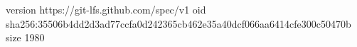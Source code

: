 version https://git-lfs.github.com/spec/v1
oid sha256:35506b4dd2d3ad77ccfa0d242365cb462e35a40dcf066aa6414cfe300c50470b
size 1980
